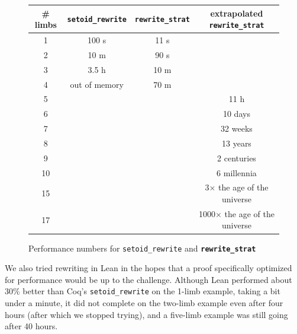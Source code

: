 \documentclass[sn-mathphys,pdflatex]{sn-jnl}%
\newcommand{\tacsetoidrewrite}{\texttt{setoid_rewrite}}
\newcommand{\tacrewritestrat}{\textbf{\texttt{rewrite\_strat}}}
\theoremstyle{thmstyleone}%
\theoremstyle{thmstyletwo}%
\theoremstyle{thmstylethree}%
\begin{document}
\begin{figure}
\begin{tabular}{ | c | c | c | c| }
  \hline
  \# limbs & \tacsetoidrewrite{} &  \tacrewritestrat{} & extrapolated \tacrewritestrat{}  \\
  \hline
    1& 100 s & 11 s & \\
    \hline
    2& 10 m & 90 s  & \\
     \hline
    3& 3.5 h & 10 m & \\
     \hline
    4& out of memory & 70 m & \\ %
      \hline
    5&  & & 11 h \\
     \hline
    6&  & & 10 days \\
     \hline
    7&  & & 32 weeks \\
     \hline
    8&  & & 13 years \\
     \hline
    9&  & & 2 centuries \\
     \hline
    10&  & & 6 millennia \\
    \hline
    15&  & & 3$\times$ the age of the universe \\
      \hline
    17 &  & & 1000$\times$ the age of the universe \\
  \hline
  \end{tabular}
\caption{\label{tab:setoid-rewrite-perf-nlimbs}Performance numbers for \tacsetoidrewrite{} and \tacrewritestrat{}}
\end{figure}

We also tried rewriting in Lean in the hopes that a proof  specifically optimized for performance would be up to the challenge.
Although Lean performed about 30\% better than Coq's \tacsetoidrewrite{} on the 1-limb example, taking a bit under a minute, it did not complete on the two-limb example even after four hours (after which we stopped trying), and a five-limb example was still going after 40 hours.



\end{document}
